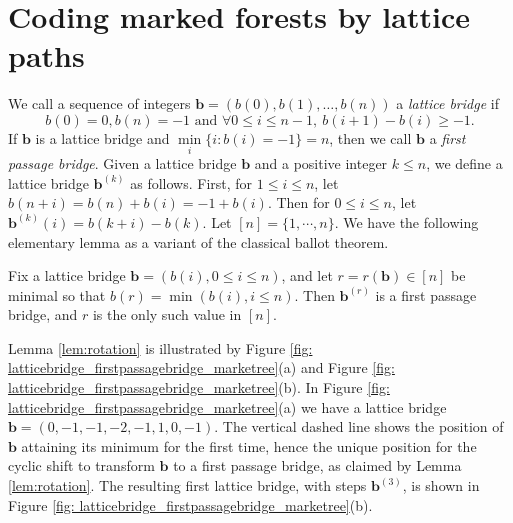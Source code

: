 \section{\bf Coding marked forests by lattice paths}\label{sec:combinatorics}

We call a sequence of integers $\mathbf{b}=(b(0), b(1), \ldots, b(n))$ a {\em lattice bridge} if \[b(0)=0, b(n)=-1 \mbox{ and } \forall 0\le i\le n-1, ~b(i+1)-b(i)\ge -1.\] If $\mathbf{b}$ is a lattice bridge and $\min\limits_i\{i:b(i)=-1\}=n$, then we call $\mathbf{b}$ a {\em first passage bridge}. 
Given a lattice bridge $\mathbf{b}$ and a positive integer $k\le n$, we define a lattice bridge $\mathbf{b}^{(k)}$ as follows. First, for $1\le i\le n$, let $b(n+i)=b(n)+b(i)=-1+b(i)$. Then for $0\le i\le n$, let $\mathbf{b}^{(k)}(i)=b(k+i)-b(k)$.
Let $[n]=\{1,\cdots,n\}$.
We have the following elementary lemma as a variant of the classical ballot theorem.

\begin{lem}\label{lem:rotation}
Fix a lattice bridge $\mathbf{b}=(b(i), 0\le i\le n)$, and let $r=r(\mathbf{b})\in [n]$ be minimal so that $b(r)=\min (b(i), i\le n)$. Then $\mathbf{b}^{(r)}$ is a first passage bridge, and $r$ is the only such value in $[n]$.
\end{lem}

Lemma \ref{lem:rotation} is illustrated by Figure \ref{fig: latticebridge_firstpassagebridge_marketree}(a) and Figure \ref{fig: latticebridge_firstpassagebridge_marketree}(b). In Figure \ref{fig: latticebridge_firstpassagebridge_marketree}(a) we have a lattice bridge $\mathbf{b}=(0,-1,-1,-2,-1,1,0,-1)$. The vertical dashed line shows the position of $\mathbf{b}$ attaining its minimum for the first time, hence the unique position for the cyclic shift to transform $\mathbf{b}$ to a first passage bridge, as claimed by Lemma \ref{lem:rotation}. The resulting first lattice bridge, with steps $\mathbf{b}^{(3)}$, is shown in Figure \ref{fig: latticebridge_firstpassagebridge_marketree}(b).


%
%


